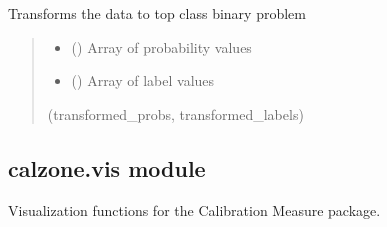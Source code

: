 \documentclass[letterpaper,10pt,english]{sphinxmanual}
\begin{document}
\begin{fulllineitems}
\label{\detokenize{calzone:calzone.utils.transform_topclass}}
\pysigstartsignatures
{}
\pysigstopsignatures
\sphinxAtStartPar
Transforms the data to top class binary problem
\begin{quote}\begin{description}
\begin{itemize}
\item {} 
\sphinxAtStartPar
{} () \textendash{} Array of probability values

\item {} 
\sphinxAtStartPar
{} () \textendash{} Array of label values

\end{itemize}

\sphinxAtStartPar
{} \textendash{} (transformed\_probs, transformed\_labels)

\end{description}\end{quote}

\end{fulllineitems}



\subsection{calzone.vis module}
\label{\detokenize{calzone:module-calzone.vis}}\label{\detokenize{calzone:calzone-vis-module}}
\sphinxAtStartPar
Visualization functions for the Calibration Measure package.
\end{document}
